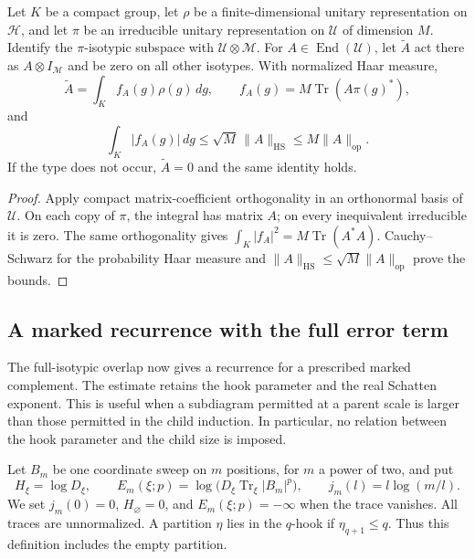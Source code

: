 \begin{lemma}
\label{s:compact-coefficient-extraction}
Let $K$ be a compact group, let $\rho$ be a finite-dimensional unitary
representation on $\mathcal H$, and let $\pi$ be an irreducible
unitary representation on $\mathcal U$ of dimension $M$.
Identify the $\pi$-isotypic subspace with
$\mathcal U\otimes\mathcal M$. For $A\in\operatorname{End}(\mathcal U)$,
let $\widetilde A$ act there as $A\otimes I_{\mathcal M}$ and be
zero on all other isotypes. With normalized Haar measure,
\[
 \widetilde A=\int_K f_A(g)\rho(g)\,dg,
 \qquad f_A(g)=M\operatorname{Tr}(A\pi(g)^*),
\]
and
\[
 \int_K|f_A(g)|\,dg
 \le\sqrt M\,\|A\|_{\mathrm{HS}}
 \le M\|A\|_{\mathrm{op}}.
\]
If the type does not occur, $\widetilde A=0$ and the same identity
holds.
\end{lemma}
\begin{proof}
Apply compact matrix-coefficient orthogonality
\cite[Theorem IV.3.8(i)--(ii)]{Morel2018} in an orthonormal basis of
$\mathcal U$. On each copy of $\pi$, the integral has matrix $A$;
on every inequivalent irreducible it is zero. The same orthogonality
gives
$\int_K|f_A|^2=M\operatorname{Tr}(A^*A)$.
Cauchy--Schwarz for the probability Haar measure and
$\|A\|_{\mathrm{HS}}\le\sqrt M\|A\|_{\mathrm{op}}$
prove the bounds.
\end{proof}

\subsection{A marked recurrence with the full error term}
\label{s:general-marked-recurrence-section}

The full-isotypic overlap now gives a recurrence for a prescribed
marked complement. The estimate retains the hook parameter and the
real Schatten exponent.
This is useful when a subdiagram permitted at a parent scale is larger than
those permitted in the child induction.  In particular, no relation between
the hook parameter and the child size is imposed.

Let $B_m$ be one coordinate sweep on $m$ positions, for $m$ a power of two,
and put
\[
 H_\xi=\log D_\xi,\qquad
 E_m(\xi;p)=\log\bigl(D_\xi\operatorname{Tr}_\xi|B_m|^p\bigr),
 \qquad j_m(l)=l\log(m/l).
\]
We set $j_m(0)=0$, $H_\varnothing=0$, and $E_m(\xi;p)=-\infty$ when
the trace vanishes.  All traces are unnormalized.  A partition $\eta$ lies
in the $q$-hook if $\eta_{q+1}\le q$.  Thus this definition includes the
empty partition.

